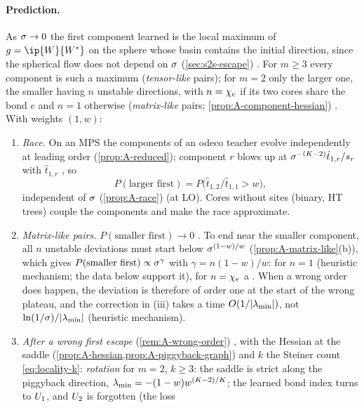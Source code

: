 \paragraph{Prediction.}
As $\sigma\to0$ the first component learned is the local maximum of $g=\ip{\W}{\Wt}$ on the sphere whose basin
contains the initial direction, since the spherical flow does not depend on $\sigma$ (\cref{sec:s2s-escape})
\derived{} . For $m\ge3$ every component is such a maximum (\emph{tensor-like} pairs); for $m=2$ only the larger one,
the smaller having $n$ unstable directions, with $n=\chi_{e}$ if its two cores share the bond $e$ and $n=1$ otherwise
(\emph{matrix-like} pairs; \cref{prop:A-component-hessian}) \derived. With weights $(1,w)$:
\begin{enumerate}[label=(\roman*)]
  \item \emph{Race.} On an MPS the components of an odeco teacher evolve independently at leading order
    (\cref{prop:A-reduced}); component $r$ blows up at $\sigma^{-(K-2)}\hat t_{1,r}/s_{r}$ with $\hat t_{1,r}$ \iid,
    so
    \begin{equation}\label{eq:order-race}
      P(\text{larger first})=P\big(\hat t_{1,2}/\hat t_{1,1}>w\big),
    \end{equation}
    independent of $\sigma$ (\cref{prop:A-race}) \proven{} (at LO). Cores without sites (binary, HT trees) couple
    the components and make the race approximate.
  \item \emph{Matrix-like pairs.} $P(\text{smaller first})\to0$ \derived. To end near the smaller component, all
    $n$ unstable deviations must start below $\sigma^{(1-w)/w}$ (\cref{prop:A-matrix-like}(b)), which gives
    $P(\text{smaller first})\propto\sigma^{\gamma}$ with $\gamma=n(1-w)/w$: for $n=1$ \empirical{} (heuristic
    mechanism; the data below support it), for $n=\chi_{e}$ a \conjecture. When a wrong order does happen, the
    deviation is therefore of order one at the start of the wrong plateau, and the correction in (iii) takes a time
    $O(1/\lvert\lambda_{\min}\rvert)$, not $\ln(1/\sigma)/\lvert\lambda_{\min}\rvert$ \empirical{} (heuristic mechanism).
  \item \emph{After a wrong first escape} (\cref{rem:A-wrong-order}) \derived{}, with the Hessian at the saddle
    \proven{} (\cref{prop:A-hessian,prop:A-piggyback-graph}) and $k$ the Steiner count \eqref{eq:locality-k}:
    \emph{rotation} for $m=2$, $k\ge3$: the saddle is strict along the piggyback direction,
    $\lambda_{\min}=-(1-w)w^{(K-2)/K}$; the learned bond index turns to $U_{1}$, and $U_{2}$ is forgotten (the loss

\end{enumerate}
